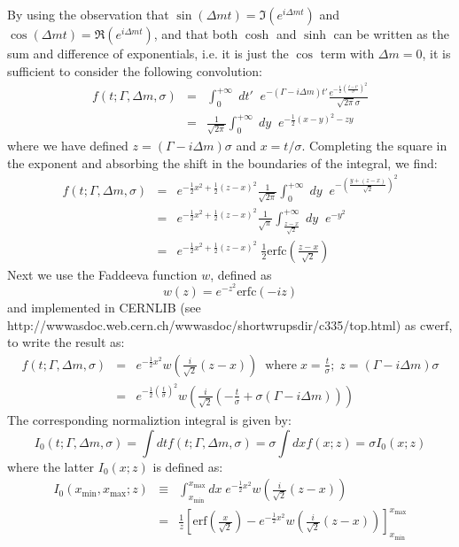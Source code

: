 \documentclass[a4paper,10pt,twosided]{article}
\begin{document}
By using the observation that $\sin(\Delta m t) = \Im\left( e^{i\Delta m t}\right)$ and $\cos(\Delta m t ) = \Re\left( e^{ i \Delta m t } \right)$, and that both $\cosh$ and $\sinh$ can
be written as the sum and difference of exponentials, i.e. it is just the $\cos$ term with $\Delta m = 0$, it is sufficient to consider the following convolution:
\begin{eqnarray*}
f(t;\Gamma,\Delta m,\sigma) &=& \int_0^{+\infty}\;dt'\;\; e^{-(\Gamma -i \Delta m)t'} \frac{ e^{-\frac{1}{2}\left( \frac{t-t'}{\sigma} \right)^2}}{\sqrt{2\pi}\sigma}
\\                          &=& \frac{1}{\sqrt{2\pi}} \int_0^{+\infty}\;dy \;\;  e^{-\frac{1}{2}\left( x-y \right)^2-zy}
\end{eqnarray*}
where we have defined $z = (\Gamma - i \Delta m ) \sigma$ and $x = t / \sigma$.
Completing the square in the exponent and absorbing the shift in the boundaries of the integral, we find:
\begin{eqnarray*}
f(t;\Gamma,\Delta m,\sigma) &=& e^{-\frac{1}{2}x^2+\frac{1}{2}(z-x)^2}  \frac{1}{\sqrt{2\pi}} \int_0^{+\infty}\;dy \;\; e^{-\left(\frac{ y+(z-x)}{\sqrt{2}} \right)^2}
\\                          &=&  e^{-\frac{1}{2}x^2+\frac{1}{2}(z-x)^2}  \frac{1}{\sqrt{\pi}} \int_{\frac{z-x}{\sqrt{2}}}^{+\infty}\;dy \;\; e^{-y^2 }
\\                          &=&  e^{-\frac{1}{2}x^2+\frac{1}{2}(z-x)^2}  \; \frac{1}{2}\mathrm{erfc}\left(\frac{z-x}{\sqrt{2}} \right)
\end{eqnarray*}
Next we use the Faddeeva function $w$,  defined as 
\begin{equation}
    w(z) = e^{-z^2}\mathrm{erfc}\left(-iz\right)
\end{equation}
and implemented in CERNLIB (see http://wwwasdoc.web.cern.ch/wwwasdoc/shortwrupsdir/c335/top.html) as $\mathrm{cwerf}$, to write the result as:
\begin{eqnarray*}
f(t;\Gamma,\Delta m,\sigma) &=&  e^{-\frac{1}{2}x^2} w\left( \frac{i}{\sqrt{2}} \left( z-x\right) \right)\;\; \mathrm{where} \; x=\frac{t}{\sigma};\; z = \left(\Gamma-i\Delta m\right)\sigma
\\   &=& e^{-\frac{1}{2}\left(\frac{t}{\sigma}\right)^2} w\left( \frac{i}{\sqrt{2}} \left( -\frac{t}{\sigma} + \sigma\left(\Gamma-i\Delta m \right) \right)  \right)
\end{eqnarray*}
The corresponding normaliztion integral is given by:
\begin{equation*}
    I_0(t;\Gamma,\Delta m,\sigma)  = \int dt f(t;\Gamma,\Delta m, \sigma) = \sigma \int dx f(x;z) = \sigma I_0(x;z)
\end{equation*}
where the latter $I_0(x;z)$ is defined as:
\begin{eqnarray*}
   I_0(x_\mathrm{min},x_\mathrm{max};z) &\equiv& \int_{x_\mathrm{min}}^{x_\mathrm{max}} dx\; e^{-\frac{1}{2}x^2} w\left( \frac{i}{\sqrt{2}}(z-x) \right) 
\\             &=&\frac{1}{z}\left[ \mathrm{erf}\left(\frac{x}{\sqrt{2}} \right) -e^{-\frac{1}{2}x^2} w\left( \frac{i}{\sqrt{2}}\left(z-x\right) \right) \right]_{x_\mathrm{min}}^{x_\mathrm{max}}
\end{eqnarray*}
\end{document}
